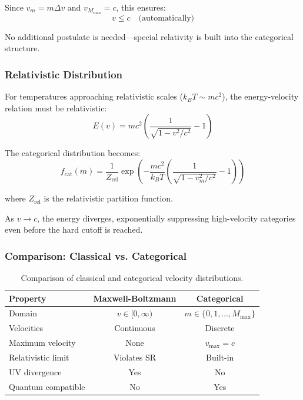 Since $v_m = m\Delta v$ and $v_{M_{\max}} = c$, this ensures:
\begin{equation}
v \leq c \quad \text{(automatically)}
\end{equation}

No additional postulate is needed—special relativity is built into the categorical structure.

\subsubsection{Relativistic Distribution}

For temperatures approaching relativistic scales ($k_B T \sim mc^2$), the energy-velocity relation must be relativistic:
\begin{equation}
E(v) = mc^2\left(\frac{1}{\sqrt{1-v^2/c^2}} - 1\right)
\end{equation}

The categorical distribution becomes:
\begin{equation}
f_{\text{cat}}(m) = \frac{1}{Z_{\text{rel}}} \exp\left(-\frac{mc^2}{k_B T}\left(\frac{1}{\sqrt{1-v_m^2/c^2}} - 1\right)\right)
\end{equation}

where $Z_{\text{rel}}$ is the relativistic partition function.

As $v \to c$, the energy diverges, exponentially suppressing high-velocity categories even before the hard cutoff is reached.

\subsubsection{Comparison: Classical vs. Categorical}

\begin{table}[h]
\centering
\begin{tabular}{lcc}
\hline
\textbf{Property} & \textbf{Maxwell-Boltzmann} & \textbf{Categorical} \\
\hline
Domain & $v \in [0, \infty)$ & $m \in \{0, 1, \ldots, M_{\max}\}$ \\
Velocities & Continuous & Discrete \\
Maximum velocity & None & $v_{\max} = c$ \\
Relativistic limit & Violates SR & Built-in \\
UV divergence & Yes & No \\
Quantum compatible & No & Yes \\
\hline
\end{tabular}
\caption{Comparison of classical and categorical velocity distributions.}
\label{tab:velocity_comparison}
\end{table}

